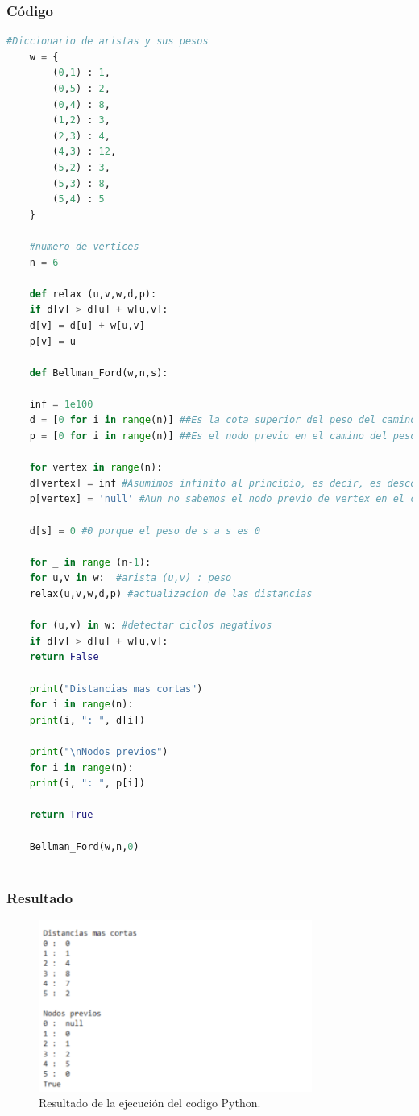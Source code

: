 \subsubsection{Código}
\begin{lstlisting}[language=Python]
	#Diccionario de aristas y sus pesos
	w = {
		(0,1) : 1,
		(0,5) : 2,
		(0,4) : 8,
		(1,2) : 3,
		(2,3) : 4,
		(4,3) : 12,
		(5,2) : 3,
		(5,3) : 8,
		(5,4) : 5
	}
	
	#numero de vertices
	n = 6
	
	def relax (u,v,w,d,p):
	if d[v] > d[u] + w[u,v]:
	d[v] = d[u] + w[u,v]
	p[v] = u
	
	def Bellman_Ford(w,n,s):
	
	inf = 1e100
	d = [0 for i in range(n)] ##Es la cota superior del peso del camino mas corto de s a v, se inicializa en infinito
	p = [0 for i in range(n)] ##Es el nodo previo en el camino del peso mas corto de s a v
	
	for vertex in range(n):
	d[vertex] = inf #Asumimos infinito al principio, es decir, es desconocido el limite
	p[vertex] = 'null' #Aun no sabemos el nodo previo de vertex en el camino mas corto
	
	d[s] = 0 #0 porque el peso de s a s es 0
	
	for _ in range (n-1):
	for u,v in w:  #arista (u,v) : peso
	relax(u,v,w,d,p) #actualizacion de las distancias
	
	for (u,v) in w: #detectar ciclos negativos
	if d[v] > d[u] + w[u,v]:
	return False
	
	print("Distancias mas cortas")
	for i in range(n):
	print(i, ": ", d[i])
	
	print("\nNodos previos")
	for i in range(n):
	print(i, ": ", p[i])
	
	return True
	
	Bellman_Ford(w,n,0)
	
\end{lstlisting}

\subsubsection{Resultado}
\begin{figure}[H]
	\centering
	\includegraphics[width=0.8\textwidth]{resultado_distancias_ejem2.png}
	\caption{Resultado de la ejecución del codigo Python.}
	\label{fig:resultado}
\end{figure}

